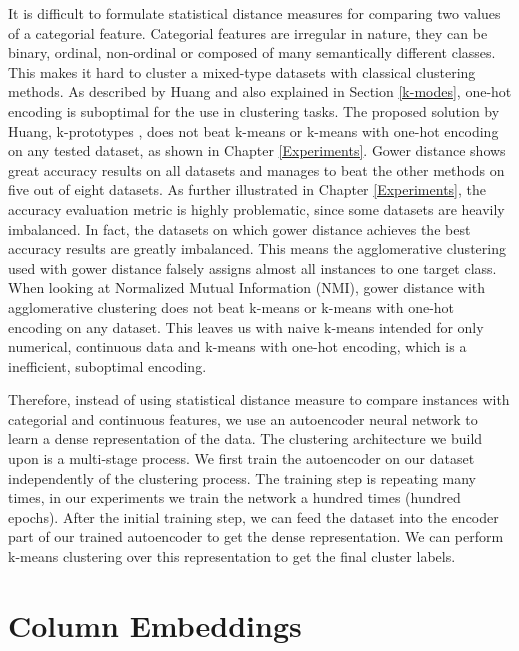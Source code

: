 It is difficult to formulate statistical distance measures for comparing two values of a categorial feature. Categorial features are irregular in nature, they can be binary, ordinal, non-ordinal or composed of many semantically different classes. This makes it hard to cluster a mixed-type datasets with classical clustering methods. As described by Huang \cite{kmodes} and also explained in Section \ref{k-modes}, one-hot encoding is suboptimal for the use in clustering tasks. The proposed solution by Huang, k-prototypes \cite{kmodes}, does not beat k-means or k-means with one-hot encoding on any tested dataset, as shown in Chapter \ref{Experiments}. Gower distance shows great accuracy results on all datasets and manages to beat the other methods on five out of eight datasets. As further illustrated in Chapter \ref{Experiments}, the accuracy evaluation metric is highly problematic, since some datasets are heavily imbalanced. In fact, the datasets on which gower distance achieves the best accuracy results are greatly imbalanced. This means the agglomerative clustering used with gower distance falsely assigns almost all instances to one target class. When looking at Normalized Mutual Information (NMI), gower distance with agglomerative clustering does not beat k-means or k-means with one-hot encoding on any dataset. This leaves us with naive k-means intended for only numerical, continuous data and k-means with one-hot encoding, which is a inefficient, suboptimal encoding.

Therefore, instead of using statistical distance measure to compare instances with categorial and continuous features, we use an autoencoder neural network to learn a dense representation of the data. The clustering architecture we build upon is a multi-stage process. We first train the autoencoder on our dataset independently of the clustering process. The training step is repeating many times, in our experiments we train the network a hundred times (hundred epochs). After the initial training step, we can feed the dataset into the encoder part of our trained autoencoder to get the dense representation. We can perform k-means clustering over this representation to get the final cluster labels.

\section{Column Embeddings}

